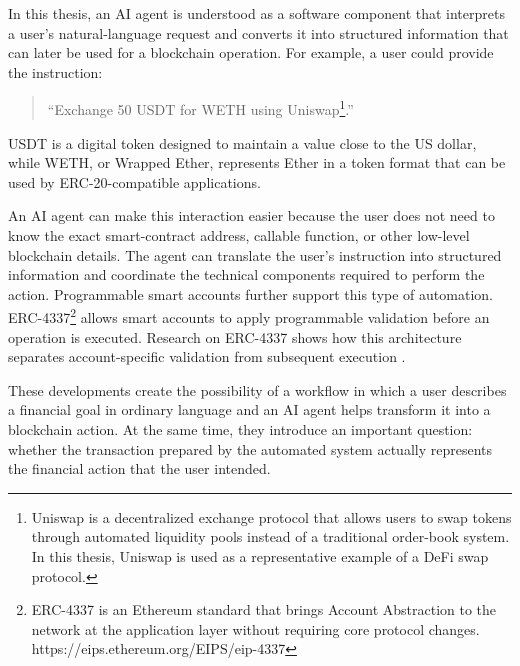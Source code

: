 In this thesis, an AI agent is understood as a software component that interprets a user's natural-language request and converts it into structured information that can later be used for a blockchain operation. For example, a user could provide the instruction:

\begin{quote}
``Exchange 50 USDT for WETH using Uniswap\footnote{Uniswap is a decentralized exchange protocol that allows users to swap tokens through automated liquidity pools instead of a traditional order-book system. In this thesis, Uniswap is used as a representative example of a DeFi swap protocol.}.''
\end{quote}

USDT is a digital token designed to maintain a value close to the US dollar, while WETH, or Wrapped Ether, represents Ether in a token format that can be used by ERC-20-compatible applications.

An AI agent can make this interaction easier because the user does not need to know the exact smart-contract address, callable function, or other low-level blockchain details. The agent can translate the user's instruction into structured information and coordinate the technical components required to perform the action. Programmable smart accounts further support this type of automation. ERC-4337\footnote{ERC-4337 is an Ethereum standard that brings Account Abstraction to the network at the application layer without requiring core protocol changes. https://eips.ethereum.org/EIPS/eip-4337} allows smart accounts to apply programmable validation before an operation is executed. Research on ERC-4337 shows how this architecture separates account-specific validation from subsequent execution \cite{buterinERC4337AccountAbstraction2021,
linMeasurementInvestigationERC43372024}.

These developments create the possibility of a workflow in which a user describes a financial goal in ordinary language and an AI agent helps transform it into a blockchain action. At the same time, they introduce an important question: whether the transaction prepared by the automated system actually represents the financial action that the user intended.




